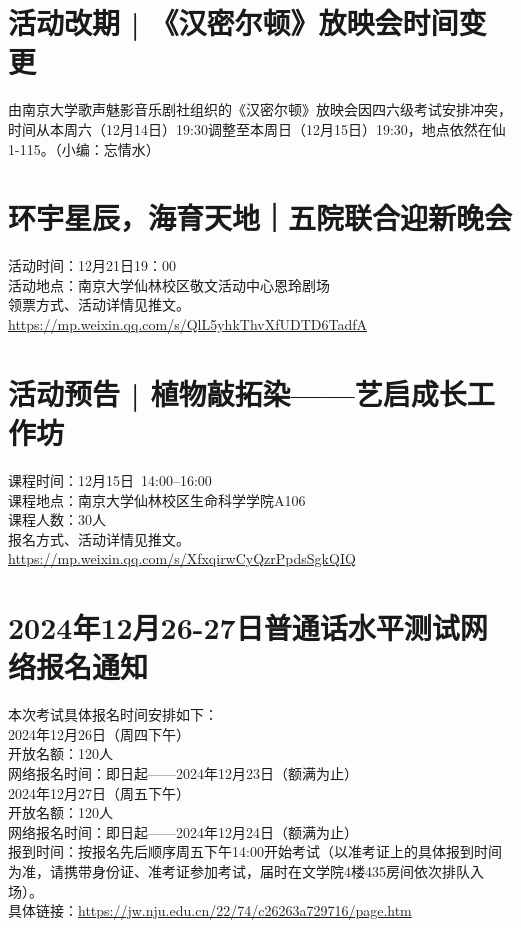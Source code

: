 \documentclass[letterpaper, 12pt]{article}
\begin{document}
\begin{multicols}{2}
\section{活动改期 | 《汉密尔顿》放映会时间变更}
由南京大学歌声魅影音乐剧社组织的《汉密尔顿》放映会因四六级考试安排冲突，时间从本周六（12月14日）19:30调整至本周日（12月15日）19:30，地点依然在仙1-115。（小编：忘情水）



\section{环宇星辰，海育天地｜五院联合迎新晚会}
活动时间：12月21日19：00\\
活动地点：南京大学仙林校区敬文活动中心恩玲剧场\\
领票方式、活动详情见推文。\\
\url{https://mp.weixin.qq.com/s/QlL5yhkThvXfUDTD6TadfA}

\section{活动预告 | 植物敲拓染——艺启成长工作坊}
课程时间：12月15日 14:00--16:00  \\
课程地点：南京大学仙林校区生命科学学院A106\\
课程人数：30人\\
报名方式、活动详情见推文。\\
\url{https://mp.weixin.qq.com/s/XfxqirwCyQzrPpdsSgkQIQ}

\section{2024年12月26-27日普通话水平测试网络报名通知}
本次考试具体报名时间安排如下：\\
2024年12月26日（周四下午）\\
开放名额：120人\\
网络报名时间：即日起——2024年12月23日（额满为止）\\
2024年12月27日（周五下午）\\
开放名额：120人\\
网络报名时间：即日起——2024年12月24日（额满为止）\\
报到时间：按报名先后顺序周五下午14:00开始考试（以准考证上的具体报到时间为准，请携带身份证、准考证参加考试，届时在文学院4楼435房间依次排队入场）。\\
具体链接：\url{https://jw.nju.edu.cn/22/74/c26263a729716/page.htm}\\


\end{multicols}
\end{document}
